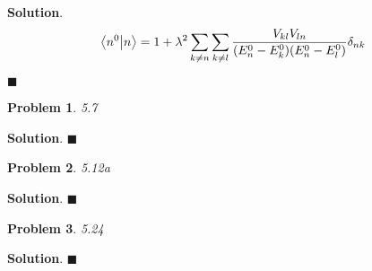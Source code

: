 \documentclass[12pt]{article}
\newtheorem{p}{Problem}
\theoremstyle{definition}
\newenvironment{s}{%
        \begin{trivlist} \item \textbf{Solution}. }{%
            \hspace*{\fill} $\blacksquare$\end{trivlist}}%
\begin{document}
{\begin{s}
\begin{align*}
\bra{n^{0}}\ket{n} &= 1 + \lambda^{2}\sum_{k\neq n}\sum_{k\neq l}\frac{V_{kl}V_{ln}}{(E_{n}^{0}-E_{k}^{0})(E_{n}^{0}-E_{l}^{0})}\delta_{nk}\\
\end{align*} 



\end{s}

\begin{p}
5.7
\end{p}

\begin{s}
\end{s}

\begin{p}
5.12a
\end{p}

\begin{s}
\end{s}

\begin{p}
5.24
\end{p}

\begin{s}
\end{s}
\end{document}
